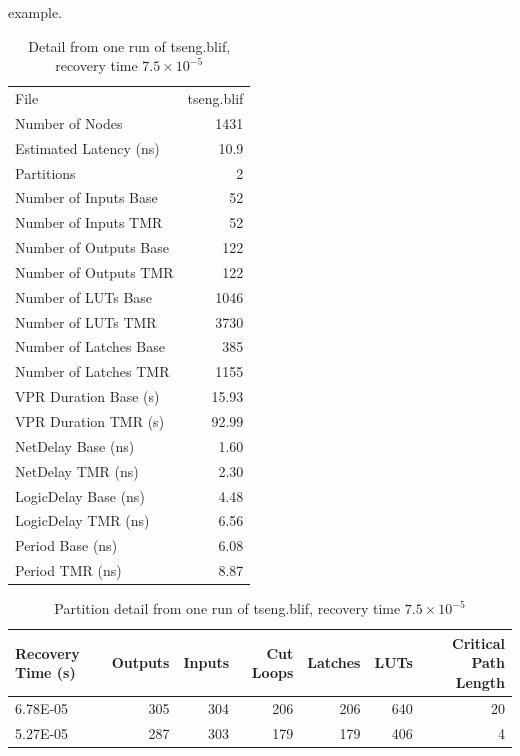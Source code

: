 \documentclass[12pt,final,oneside]{dwThesis} %
\begin{document}
   example.  \begin{table} \begin{tabular}{lr} \toprule File & tseng.blif\\
         Number of Nodes & 1431\\ Estimated Latency (ns)& 10.9\\ Partitions &
         2\\ Number of Inputs Base & 52\\ Number of Inputs TMR & 52\\ Number of
         Outputs Base & 122\\ Number of Outputs TMR & 122\\ Number of LUTs Base
         & 1046\\ Number of LUTs TMR & 3730\\ Number of Latches Base & 385\\
         Number of Latches TMR & 1155\\ VPR Duration Base (s) & 15.93\\ VPR
         Duration TMR (s) & 92.99\\ NetDelay Base (ns) & 1.60\\ NetDelay TMR
         (ns) & 2.30\\ LogicDelay Base (ns) & 4.48\\ LogicDelay TMR (ns) &
         6.56\\ Period Base (ns) & 6.08\\ Period TMR (ns) & 8.87\\ \bottomrule
      \end{tabular} \caption{Detail from one run of tseng.blif, recovery time
         $7.5\times10^{-5}$}\label{tabSanity} \end{table}
   
      \begin{table} \begin{tabular}{lrrrrrr} \toprule Recovery Time (s) &
            Outputs & Inputs & Cut Loops & Latches & \glspl{LUT} & Critical
            Path Length\\ \midrule 6.78E-05 & 305 & 304 & 206 & 206 & 640 &
            20\\ 5.27E-05 & 287 & 303 & 179 & 179 & 406 & 4\\ \bottomrule
         \end{tabular} \caption{Partition detail from one run of tseng.blif,
            recovery time $7.5\times10^{-5}$}\label{tabSanityPartitions}
      \end{table}
\end{document}
